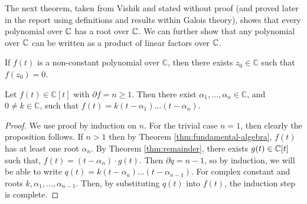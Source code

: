 The next theorem, taken from Vishik \cite{complex-functions-uon} and stated without proof (and proved later in the report using definitions and results within Galois theory), shows that every polynomial over $\mathbb C$ has a root over $\mathbb C$. We can further show that any polynomial over $\mathbb C$ can be written as a product of linear factors over $\mathbb C$. 


\begin{theorem} \label{thm:fundamental-algebra}
    If $f(t)$ is a non-constant polynomial over $\mathbb{C}$, then there exists $z_0 \in \mathbb{C}$ such that $f\left(z_0\right)=0$.
\end{theorem}

\begin{theorem} \label{thm:fundamental-algebra-2}
	Let $f(t) \in \mathbb{C}[t]$ with $\partial f=n \geq 1$. Then there exist $\alpha_1, \ldots, \alpha_n \in \mathbb{C}$, and $0 \neq k \in \mathbb{C}$, such that
	$
	f(t)=k\left(t-\alpha_1\right) \ldots\left(t-\alpha_n\right).
	$
\end{theorem}

\begin{proof}
	We use proof by induction on $n$. For the trivial case $n = 1$, then clearly the proposition follows. If $n > 1$ then by Theorem \ref{thm:fundamental-algebra}, $f(t)$ has at least one root $\alpha_n$. By Theorem \ref{thm:remainder}, there exists $g(t) \in \mathbb C[t]$ such that,
		$f(t) = (t-\alpha_n)\cdot g(t)$. 
	Then $\partial q = n - 1$, so by induction, we will be able to write
		$q(t) = k(t-\alpha_a)...(t-\alpha_{n-1})$. 
	For complex constant and roots $k,\alpha_1,...,\alpha_{n-1}$. Then, by substituting $q(t)$ into $f(t)$, the induction step is complete.
\end{proof}